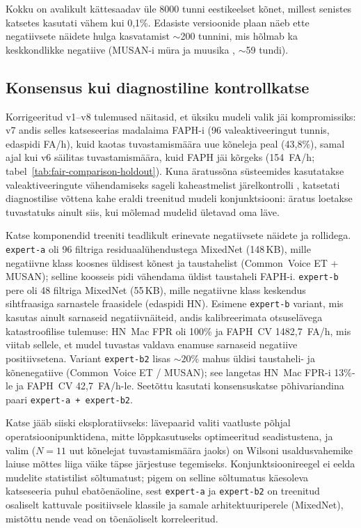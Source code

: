 Kokku on avalikult kättesaadav üle 8000 tunni eestikeelset kõnet, millest senistes katsetes kasutati vähem kui 0,1\%. Edasiste versioonide plaan näeb ette negatiivsete näidete hulga kasvatamist $\sim$200 tunnini, mis hõlmab ka keskkondlikke negatiive (MUSAN-i müra ja muusika \cite{musan2015}, $\sim$59 tundi).

\subsection{Konsensus kui diagnostiline kontrollkatse}
\label{sec:expert-consensus}

Korrigeeritud v1--v8 tulemused näitasid, et üksiku mudeli valik jäi kompromissiks: v7 andis selles katseseerias madalaima FAPH-i (96 valeaktiveeringut tunnis, edaspidi FA/h), kuid kaotas tuvastamismäära uue kõneleja peal (43,8\%), samal ajal kui v6 säilitas tuvastamismäära, kuid FAPH jäi kõrgeks (154~FA/h; tabel~\ref{tab:fair-comparison-holdout}). Kuna äratussõna süsteemides kasutatakse valeaktiveeringute vähendamiseks sageli kaheastmelist järelkontrolli \cite{apple-heysiri2017,kundu2023heimdal}, katsetati diagnostilise võttena kahe eraldi treenitud mudeli konjunktsiooni: äratus loetakse tuvastatuks ainult siis, kui mõlemad mudelid ületavad oma läve.

Katse komponendid treeniti teadlikult erinevate negatiivsete näidete ja rollidega. \texttt{expert-a} oli 96 filtriga residuaalühendustega MixedNet (148\,KB), mille negatiivne klass koosnes üldisest kõnest ja taustahelist (Common~Voice ET + MUSAN); selline koosseis pidi vähendama üldist taustaheli FAPH-i. \texttt{expert-b} pere oli 48 filtriga MixedNet (55\,KB), mille negatiivne klass keskendus sihtfraasiga sarnastele fraasidele (edaspidi HN). Esimene \texttt{expert-b} variant, mis kasutas ainult sarnaseid negatiivnäiteid, andis kalibreerimata otsuselävega katastroofilise tulemuse: HN~Mac FPR oli 100\% ja FAPH~CV 1482,7~FA/h, mis viitab sellele, et mudel tuvastas valdava enamuse sarnaseid negatiive positiivsetena. Variant \texttt{expert-b2} lisas ${\sim}20$\% mahus üldisi taustaheli- ja kõnenegatiive (Common~Voice ET / MUSAN); see langetas HN~Mac FPR-i 13\%-le ja FAPH~CV 42,7~FA/h-le. Seetõttu kasutati konsensuskatse põhivariandina paari \texttt{expert-a + expert-b2}.

Katse jääb siiski eksploratiivseks: lävepaarid valiti vaatluste põhjal operatsioonipunktidena, mitte lõppkasutuseks optimeeritud seadistustena, ja valim ($N=11$ uut kõnelejat tuvastamismäära jaoks) on Wilsoni usaldusvahemike laiuse mõttes liiga väike täpse järjestuse tegemiseks. Konjunktsioonireegel ei eelda mudelite statistilist sõltumatust; pigem on selline sõltumatus käesoleva katseseeria puhul ebatõenäoline, sest \texttt{expert-a} ja \texttt{expert-b2} on treenitud osaliselt kattuvale positiivsele klassile ja samale arhitektuuriperele (MixedNet), mistõttu nende vead on tõenäoliselt korreleeritud.

